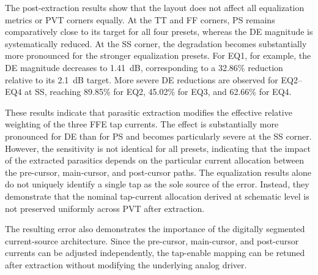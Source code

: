 The post-extraction results show that the layout does not affect all equalization metrics or \ac{PVT} corners equally. At the \ac{TT} and \ac{FF} corners, \ac{PS} remains comparatively close to its target for all four presets, whereas the \ac{DE} magnitude is systematically reduced. At the \ac{SS} corner, the degradation becomes substantially more pronounced for the stronger equalization presets. For EQ1, for example, the \ac{DE} magnitude decreases to 1.41~dB, corresponding to a 32.86\% reduction relative to its 2.1~dB target. More severe \ac{DE} reductions are observed for EQ2--EQ4 at \ac{SS}, reaching 89.85\% for EQ2, 45.02\% for EQ3, and 62.66\% for EQ4.

These results indicate that parasitic extraction modifies the effective relative weighting of the three \ac{FFE} tap currents. The effect is substantially more pronounced for \ac{DE} than for \ac{PS} and becomes particularly severe at the \ac{SS} corner. However, the sensitivity is not identical for all presets, indicating that the impact of the extracted parasitics depends on the particular current allocation between the pre-cursor, main-cursor, and post-cursor paths. The equalization results alone do not uniquely identify a single tap as the sole source of the error. Instead, they demonstrate that the nominal tap-current allocation derived at schematic level is not preserved uniformly across \ac{PVT} after extraction.

The resulting error also demonstrates the importance of the digitally segmented current-source architecture. Since the pre-cursor, main-cursor, and post-cursor currents can be adjusted independently, the tap-enable mapping can be retuned after extraction without modifying the underlying analog driver.


